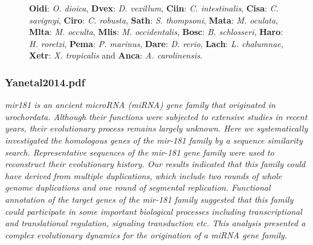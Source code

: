 \documentclass[graybox]{svmult}
\begin{document}
\begin{figure}[ht!]
{\textbf{Oidi}: \textit{O. dioica}, \textbf{Dvex}: \textit{D. vexillum}, 
\textbf{Ciin}: \textit{C. intestinalis}, \textbf{Cisa}: \textit{C. savignyi}, 
\textbf{Ciro}: \textit{C. robusta}, \textbf{Sath}: \textit{S. thompsoni}, 
\textbf{Mata}: \textit{M. oculata}, \textbf{Mlta}: \textit{M. occulta}, 
\textbf{Mlis}: \textit{M. occidentalis}, \textbf{Bosc}: \textit{B. schlosseri}, 
\textbf{Haro}: \textit{H. roretzi}, \textbf{Pema}: \textit{P. marinus}, 
\textbf{Dare}: \textit{D. rerio}, \textbf{Lach}: \textit{L. chalumnae}, 
\textbf{Xetr}: \textit{X. tropicalis} and \textbf{Anca}: \textit{A. 
carolinensis}.}
\end{figure}

\subsubsection{Yanetal2014.pdf}

\cite{Yang2014}
\textit{mir181 is an ancient microRNA (miRNA) gene family that originated in urochordata. Although their functions were subjected to extensive studies in recent years, their evolutionary process remains largely unknown. Here we systematically investigated the homologous genes of the mir-181 family by a sequence similarity search. Representative sequences of the mir-181 gene family were used to reconstruct their evolutionary history. Our results indicated that this family could have derived from multiple duplications, which include two rounds of whole genome duplications and one round of segmental replication. Functional annotation of the target genes of the mir-181 family suggested that this family could participate in some important biological processes including transcriptional and translational regulation, signaling transduction etc. This analysis presented a complex evolutionary dynamics for the origination of a miRNA gene family.}
\end{document}
